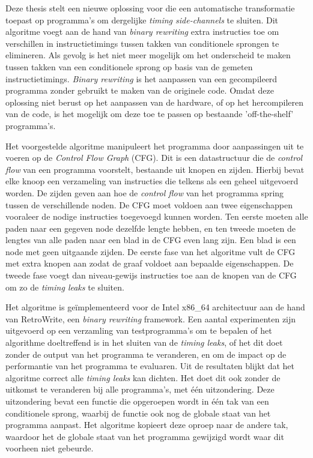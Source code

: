 \documentclass[master=cws,masteroption=ai, english]{kulemt}
\begin{document}
\begin{abstract*}
Deze thesis stelt een nieuwe oplossing voor die een automatische transformatie toepast op programma's om dergelijke \textit{timing side-channels} te sluiten. 
Dit algoritme voegt aan de hand van \textit{binary rewriting} extra instructies toe om verschillen in instructietimings tussen takken van conditionele sprongen te elimineren. 
Als gevolg is het niet meer mogelijk om het onderscheid te maken tussen takken van een conditionele sprong op basis van de gemeten instructietimings.
\textit{Binary rewriting} is het aanpassen van een gecompileerd programma zonder gebruikt te maken van de originele code. 
Omdat deze oplossing niet berust op het aanpassen van de hardware, of op het hercompileren van de code, is het mogelijk om deze toe te passen op bestaande 'off-the-shelf' programma's. 

Het voorgestelde algoritme manipuleert het programma door aanpassingen uit te voeren op de \textit{Control Flow Graph} (CFG). 
Dit is een datastructuur die de \textit{control flow} van een programma voorstelt, bestaande uit knopen en zijden. Hierbij bevat elke knoop een verzameling van instructies die telkens 
als een geheel uitgevoerd worden. De zijden geven aan hoe de \textit{control flow} van het programma spring tussen de verschillende noden. 
De CFG moet voldoen aan twee eigenschappen vooraleer de nodige instructies toegevoegd kunnen worden. 
Ten eerste moeten alle paden naar een gegeven node dezelfde lengte hebben, en ten tweede 
moeten de lengtes van alle paden naar een blad in de CFG even lang zijn. Een blad is een node met geen uitgaande zijden. 
De eerste fase van het algoritme vult de CFG met extra knopen aan zodat de graaf voldoet aan bepaalde eigenschappen. 
De tweede fase voegt dan niveau-gewijs instructies toe aan de knopen van de CFG om zo de \textit{timing leaks} te sluiten. 

Het algoritme is ge\"implementeerd voor de Intel x86\_64 architectuur aan de hand van RetroWrite, een \textit{binary rewriting} framework. 
Een aantal experimenten zijn uitgevoerd op een verzamling van testprogramma's om te bepalen of het algorithme doeltreffend is in het sluiten van de \textit{timing leaks}, of het dit doet 
zonder de output van het programma te veranderen, en om de impact op de performantie van het programma te evaluaren. 
Uit de resultaten blijkt dat het algoritme correct alle \textit{timing leaks} kan dichten. Het doet dit ook zonder de uitkomst te veranderen bij alle programma's, met \'e\'en uitzondering. 
Deze uitzondering bevat een functie die opgeroepen wordt in \'e\'en tak van een conditionele sprong, waarbij de functie ook nog de globale staat van het programma aanpast. Het algoritme kopieert deze oproep naar de andere tak, waardoor
het de globale staat van het programma gewijzigd wordt waar dit voorheen niet gebeurde. 


\end{abstract*}
\end{document}
